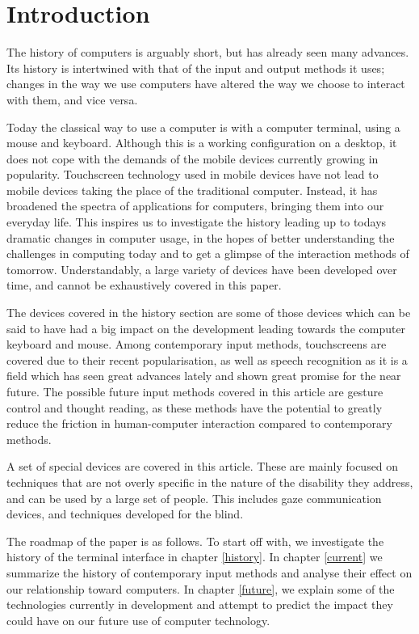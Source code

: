 
\section{Introduction}

The history of computers is arguably short, but has already seen many advances. Its history is intertwined with that of the input and output methods it uses; changes in the way we use computers have altered the way we choose to interact with them, and vice versa. 

Today the classical way to use a computer is with a computer terminal, using a mouse and keyboard. Although this is a working configuration on a desktop, it does not cope with the demands of the mobile devices currently growing in popularity. Touchscreen technology used in mobile devices have not lead to mobile devices taking the place of the traditional computer. Instead, it has broadened the spectra of applications for computers, bringing them into our everyday life. This inspires us to investigate the history leading up to todays dramatic changes in computer usage, in the hopes of better understanding the challenges in computing today and to get a glimpse of the interaction methods of tomorrow. Understandably, a large variety of devices have been developed over time, and cannot be exhaustively covered in this paper.

The devices covered in the history section are some of those devices which can be said to have had a big impact on the development leading towards the computer keyboard and mouse. Among contemporary input methods, touchscreens are covered due to their recent popularisation, as well as speech recognition as it is a field which has seen great advances lately and shown great promise for the near future. The possible future input methods covered in this article are gesture control and thought reading, as these methods have the potential to greatly reduce the friction in human-computer interaction compared to contemporary methods.

A set of special devices are covered in this article. These are mainly focused on techniques that are not overly specific in the nature of the disability they address, and can be used by a large set of people. This includes gaze communication devices, and techniques developed for the blind.

The roadmap of the paper is as follows. To start off with, we investigate the history of the terminal interface in chapter \ref{history}. In chapter \ref{current} we summarize the history of contemporary input methods and analyse their effect on our relationship toward computers. In chapter \ref{future}, we explain some of the technologies currently in development and attempt to predict the impact they could have on our future use of computer technology.
